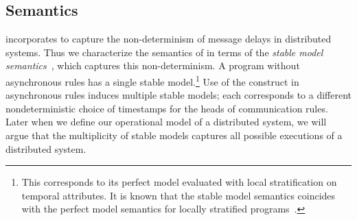 
%


\subsection{Semantics}
\lang incorporates  to capture the non-determinism of message delays in distributed systems.  Thus we characterize the semantics of \lang  in terms of the {\em stable model semantics}~\cite{stable-model}, which captures this non-determinism.  A \lang program without asynchronous rules has a single stable model.\footnote{This corresponds to its perfect model evaluated with local stratification on temporal attributes.  It is known that the stable model semantics coincides with the perfect model semantics for locally stratified programs~\cite{stable-model}.}  Use of the  construct in asynchronous rules induces multiple stable models; each corresponds to a different nondeterministic choice of timestamps for the heads of communication rules.    Later when we define our operational model of a distributed system, we will argue that the multiplicity of stable models captures all possible executions of a distributed system.

